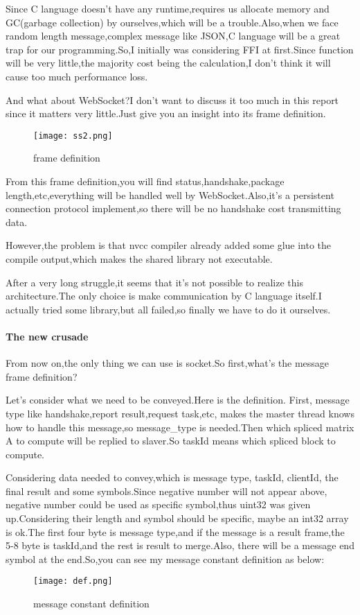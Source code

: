 \documentclass[12pt]{scrartcl} %
\begin{document}
Since C language doesn't have any runtime,requires us allocate memory and GC(garbage collection) by ourselves,which will be a trouble.Also,when we face random length message,complex message like JSON,C language will be a great trap for our programming.So,I initially was considering FFI at first.Since function will be very little,the majority cost being the calculation,I don't think it will cause too much performance loss.

And what about WebSocket?I don't want to discuss it too much in this report since it matters very little.Just give you an insight into its frame definition.
\begin{figure}[H]
    \centering
    \texttt{[image: ss2.png]}
    \caption{frame definition}
    \label{}
\end{figure}

From this frame definition,you will find status,handshake,package length,etc,everything will be handled well by WebSocket.Also,it's a persistent connection protocol implement,so there will be no handshake cost transmitting data.

However,the problem is that nvcc compiler already added some glue into the compile output,which makes the shared library not executable.

After a very long struggle,it seems that it's not possible to realize this architecture.The only choice is make communication by C language itself.I actually tried some library,but all failed,so finally we have to do it ourselves.
\paragraph{The new crusade}\;\newline
From now on,the only thing we can use is socket.So first,what's the message frame definition?

Let's consider what we need to be conveyed.Here is the definition. First, message type like handshake,report result,request task,etc, makes the master thread knows how to handle this message,so message\_type is needed.Then which spliced matrix A to compute will be replied to slaver.So taskId means which spliced block to compute.

Considering data needed to convey,which is message type, taskId, clientId, the final result and some symbols.Since negative number will not appear above, negative number could be used as specific symbol,thus uint32 was given up.Considering their length and symbol should be specific, maybe an int32 array is ok.The first four byte is message type,and if the message is a result frame,the 5-8 byte is taskId,and the rest is result to merge.Also, there will be a message end symbol at the end.So,you can see my message constant definition as below:
\begin{figure}[H]
    \centering
    \texttt{[image: def.png]}
    \caption{message constant definition}
    \label{}
\end{figure}
\end{document}
